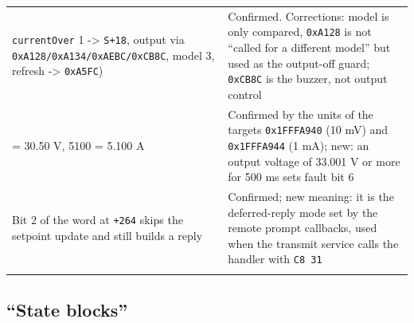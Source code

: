 {\begin{longtable}[]{@{}
  >{\raggedright\arraybackslash}p{}
  >{\raggedright\arraybackslash}p{}@{}}
\texttt{currentOver} 1 -\textgreater{} \texttt{S+18}, output via
\texttt{0xA128/\allowbreak{}0xA134/\allowbreak{}0xAEBC/\allowbreak{}0xCB8C}, model 3, refresh -\textgreater{}
\texttt{0xA5FC}) & Confirmed. Corrections: model is only compared,
\texttt{0xA128} is not ``called for a different model'' but used as the
output-off guard; \texttt{0xCB8C} is the buzzer, not output control \\
3050 = 30.50 V, 5100 = 5.100 A & Confirmed by the units of the targets
\texttt{0x1FFFA940} (10 mV) and \texttt{0x1FFFA944} (1 mA); new: an
output voltage of 33.001 V or more for 500 ms sets fault bit 6 \\
Bit 2 of the word at \texttt{+264} skips the setpoint update and still
builds a reply & Confirmed; new meaning: it is the deferred-reply mode
set by the remote prompt callbacks, used when the transmit service calls
the handler with \texttt{C8\ 31} \\*
\end{longtable}
}

\subsection{``State blocks''}\label{state-blocks}

